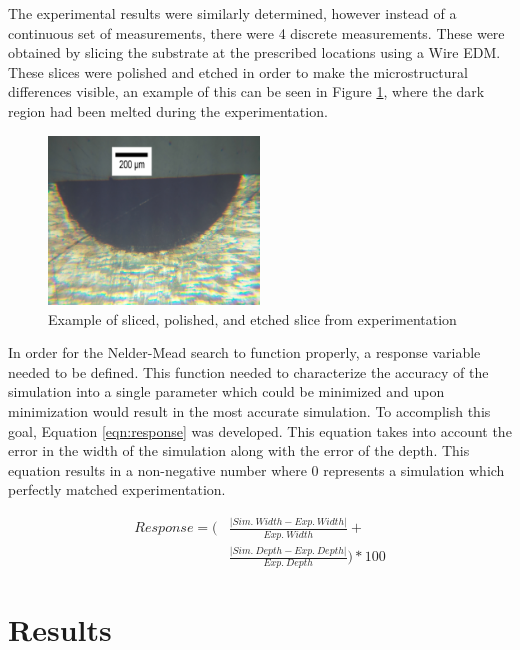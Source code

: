 \documentclass[pdflatex,sn-mathphys]{sn-jnl}
\begin{document}
	The experimental results were similarly determined, however instead of a continuous set of measurements, there were 4 discrete measurements.  These were obtained by slicing the substrate at the prescribed locations using a Wire \ac{EDM}.  These slices were polished and etched in order to make the microstructural differences visible, an example of this can be seen in Figure \ref{fig:7075_7_8C}, where the dark region had been melted during the experimentation.
	\begin{figure}[!htb]
		\centering
		\includegraphics[width=0.5\textwidth]{7075_7_8C}
		\caption{Example of sliced, polished, and etched slice from experimentation}
		\label{fig:7075_7_8C}
	\end{figure}
	
	In order for the Nelder-Mead search to function properly, a response variable needed to be defined.  This function needed to characterize the accuracy of the simulation into a single parameter which could be minimized and upon minimization would result in the most accurate simulation.  To accomplish this goal, Equation \ref{eqn:response} was developed.  This equation takes into account the error in the width of the simulation along with the error of the depth.  This equation results in a non-negative number where 0 represents a simulation which perfectly matched experimentation.
	
	\begin{equation}\label{eqn:response}
		\begin{split}
			Response =  \Biggl ( &\frac{\lvert Sim.\ Width - Exp.\ Width \rvert}{Exp.\ Width} + \\ 
			&\frac{\lvert Sim.\ Depth - Exp.\ Depth \rvert}{Exp.\ Depth} \Biggr ) * 100
		\end{split}
	\end{equation}


\section{Results}
\end{document}
